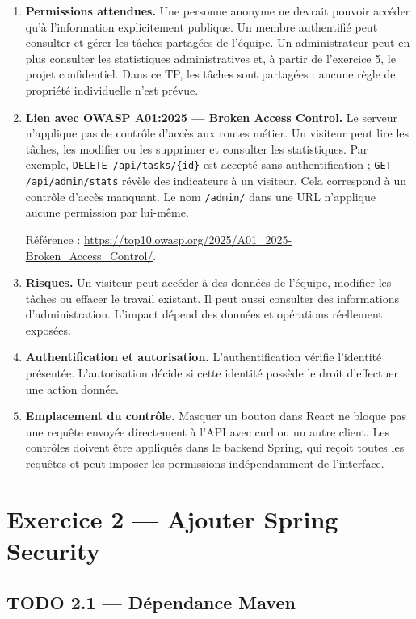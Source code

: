 \documentclass[11pt,a4paper]{article}
\begin{document}
\begin{enumerate}
\item \textbf{Permissions attendues.} Une personne anonyme ne devrait pouvoir accéder qu’à l’information explicitement publique. Un membre authentifié peut consulter et gérer les tâches partagées de l’équipe. Un administrateur peut en plus consulter les statistiques administratives et, à partir de l’exercice 5, le projet confidentiel. Dans ce TP, les tâches sont partagées : aucune règle de propriété individuelle n’est prévue.

\item \textbf{Lien avec OWASP A01:2025 — Broken Access Control.} Le serveur n’applique pas de contrôle d’accès aux routes métier. Un visiteur peut lire les tâches, les modifier ou les supprimer et consulter les statistiques. Par exemple, \texttt{DELETE /api/tasks/\{id\}} est accepté sans authentification ; \texttt{GET /api/admin/stats} révèle des indicateurs à un visiteur. Cela correspond à un contrôle d’accès manquant. Le nom \texttt{/admin/} dans une URL n’applique aucune permission par lui-même.

Référence : \url{https://top10.owasp.org/2025/A01_2025-Broken_Access_Control/}.

\item \textbf{Risques.} Un visiteur peut accéder à des données de l’équipe, modifier les tâches ou effacer le travail existant. Il peut aussi consulter des informations d’administration. L’impact dépend des données et opérations réellement exposées.

\item \textbf{Authentification et autorisation.} L’authentification vérifie l’identité présentée. L’autorisation décide si cette identité possède le droit d’effectuer une action donnée.

\item \textbf{Emplacement du contrôle.} Masquer un bouton dans React ne bloque pas une requête envoyée directement à l’API avec curl ou un autre client. Les contrôles doivent être appliqués dans le backend Spring, qui reçoit toutes les requêtes et peut imposer les permissions indépendamment de l’interface.
\end{enumerate}

\section{Exercice 2 — Ajouter Spring Security}

\subsection{TODO 2.1 — Dépendance Maven}
\end{document}
